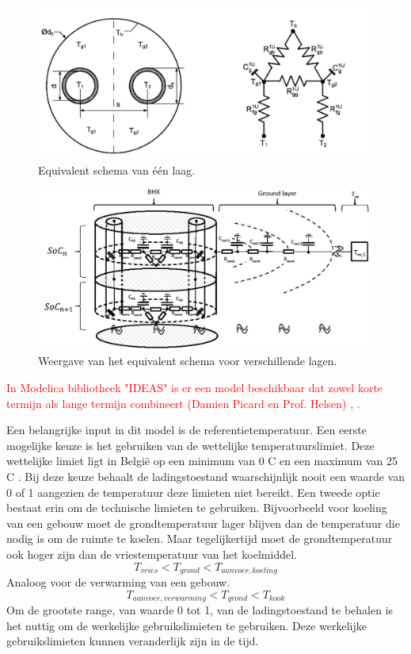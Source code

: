 \documentclass[a4paper,oneside,11pt]{report}
\numberwithin{figure}{section}
\numberwithin{table}{section}
\numberwithin{equation}{section}
\begin{document}
\begin{figure}[hbtp] 
	\centering
	\includegraphics[width=0.8 \textwidth]{def_fig2.jpg}
	\caption{Equivalent schema van \'e\'en laag.}
	\label{fig:def_2}
\end{figure}

\begin{figure}[hbtp] 
	\centering
	\includegraphics[width=0.8 \textwidth]{def_fig3.jpg}
	\caption{Weergave van het equivalent schema voor verschillende lagen.}
	\label{fig:def_3}
\end{figure}


\textcolor{red}{In Modelica bibliotheek "IDEAS" is er een model beschikbaar dat zowel korte termijn als lange termijn combineert (Damien Picard en Prof. Helsen) \cite{R7}, \cite{R25}.} 
  


Een belangrijke input in dit model is de referentietemperatuur. Een eerste mogelijke keuze is het gebruiken van de wettelijke temperatuurslimiet. Deze wettelijke limiet ligt in Belgi\"e op een minimum van 0 \degree C en een maximum van 25 \degree C \cite{}. Bij deze keuze behaalt de ladingstoestand waarschijnlijk nooit een waarde van 0 of 1 aangezien de temperatuur deze limieten niet bereikt. 
Een tweede optie bestaat erin om de technische limieten te gebruiken. Bijvoorbeeld voor koeling van een gebouw moet de grondtemperatuur lager blijven dan de temperatuur die nodig is om de ruimte te koelen. Maar tegelijkertijd moet de grondtemperatuur ook hoger zijn dan de vriestemperatuur van het koelmiddel. 
\begin{equation} \label{def_eq4}
T_{vries}<T_{grond}<T_{aanvoer,koeling}
\end{equation}
Analoog voor de verwarming van een gebouw.
\begin{equation}\label{def_eq5}
T_{aanvoer,verwarming}<T_{grond}<T_{kook}
\end{equation}
Om de grootste range, van waarde 0 tot 1, van de ladingstoestand te behalen is het nuttig om de werkelijke gebruikslimieten te gebruiken. Deze werkelijke gebruikslimieten kunnen veranderlijk zijn in de tijd. 
\end{document}
